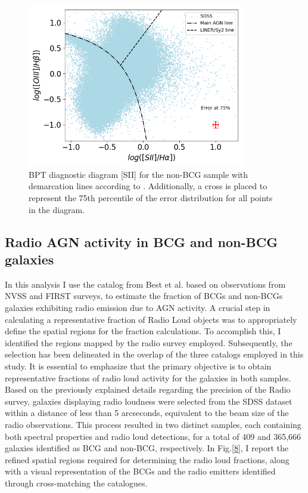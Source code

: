\begin{figure}[hbtp]
  \centering
  \includegraphics[width=0.85\textwidth]{SDSS-SII1731-V22}
  \caption{BPT diagnostic diagram [SII] for the non-BCG sample with demarcation lines according to \cite{2006MNRAS.372..961K}.
  Additionally, a cross is placed to represent the 75th percentile of the error distribution for all points in the diagram. }
  \label{7}
\end{figure}


\newpage
\subsection{Radio AGN activity in BCG and non-BCG galaxies}
In this analysis I use the catalog from Best et al. \cite{2005MNRAS.362....9B} based on observations from NVSS and FIRST surveys, to estimate the fraction of BCGs and non-BCGs galaxies exhibiting radio emission due to AGN activity.
A crucial step in calculating a representative fraction of Radio Loud objects was to appropriately define the spatial regions for the fraction calculations. To accomplish this, I identified the regions mapped by the radio survey employed. Subsequently, the selection has been delineated in the overlap of the three catalogs employed in this study. It is essential to emphasize that the primary objective is to obtain representative fractions of radio loud activity for the galaxies in both samples.
Based on the previously explained details regarding the precision of the Radio survey, galaxies displaying radio loudness were selected from the SDSS dataset within a distance of less than 5 arcseconds, equivalent to the beam size of the radio observations. This process resulted in two distinct samples, each containing both spectral properties and radio loud detections, for a total of 409 and 365,666 galaxies identified as BCG and non-BCG, respectively. In Fig.\ref{8}, I report the refined spatial regions required for determining the radio loud fractions, along with a visual representation of the BCGs and the radio emitters identified through cross-matching the catalogues.

